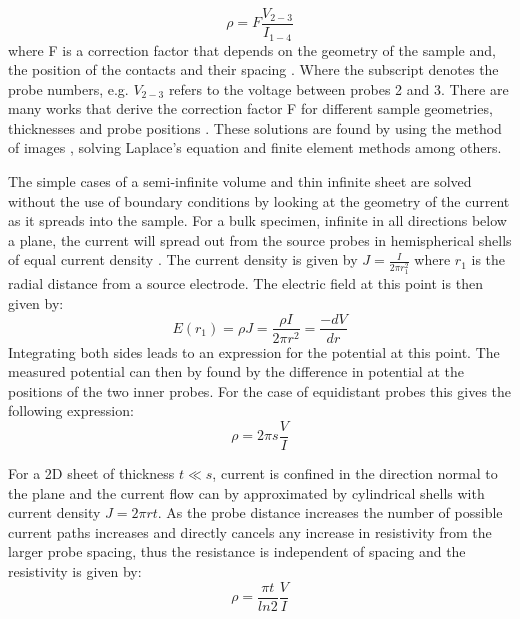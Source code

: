     \begin{equation}
    \rho = F\frac{V_{2-3}}{I_{1-4}}
    \end{equation}
    where F is a correction factor that depends on the geometry of the sample and, the position of the contacts and their spacing \cite{Miccoli2015TheSystems}. Where the subscript denotes the probe numbers, e.g. $V_{2-3}$ refers to the voltage between probes 2 and 3. There are many works that derive the correction factor F for different sample geometries, thicknesses and probe positions \cite{Smits} \cite{ValdestResistivityTransistors} \cite{Topsoe1991GeometricCorrection} \cite{}. These solutions are found by using the method of images \cite{ValdestResistivityTransistors}, solving Laplace's equation \cite{Esposito2000DeterminationCrystals} and finite element methods \cite{Zimney2007CorrectionStudy} among others. 
    
    The simple cases of a semi-infinite volume and thin infinite sheet are solved without the use of boundary conditions by looking at the geometry of the current as it spreads into the sample. For a bulk specimen, infinite in all directions below a plane, the current will spread out from the source probes in hemispherical shells of equal current density \cite{Miccoli2015TheSystems}.
    The current density is given by $J=\frac{I}{2 \pi r^2_1}$ where $r_1$ is the radial distance from a source electrode. The electric field at this point is then given by:
    \begin{equation}
    E(r_1) = \rho J = \frac{\rho I}{2 \pi r^2}=\frac{-dV}{dr}
    \end{equation}
    Integrating both sides leads to an expression for the potential at this point. The measured potential can then by found by the difference in potential at the positions of the two inner probes. For the case of equidistant probes this gives the following expression:
    \begin{equation}
        \rho = 2 \pi s\frac{V}{I}
    \end{equation}
    
    For a 2D sheet of thickness $t \ll s$, current is confined in the direction normal to the plane and the current flow can by approximated by cylindrical shells with current density $J=2 \pi rt$. As the probe distance increases the number of possible current paths increases and directly cancels any increase in resistivity from the larger probe spacing, thus the resistance is independent of spacing and the resistivity is given by: 
    \begin{equation}
        \rho = \frac{\pi t}{ln2}\frac{V}{I}
    \end{equation}
  
